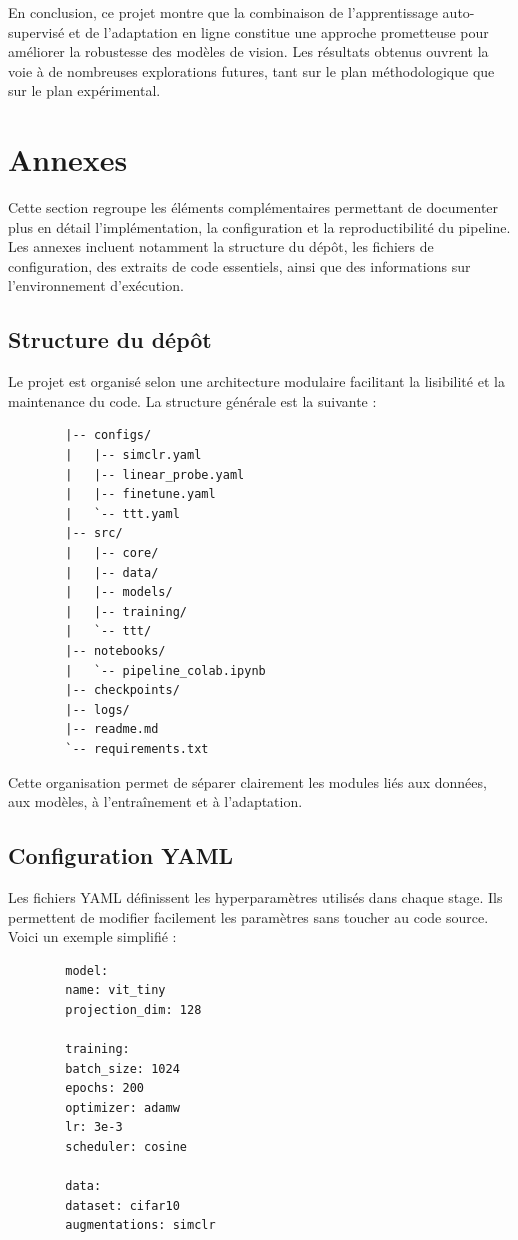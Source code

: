 \documentclass[12pt,a4paper]{report}
\begin{document}
	En conclusion, ce projet montre que la combinaison de l’apprentissage auto-supervisé et de l’adaptation en ligne constitue une approche prometteuse pour améliorer la robustesse des modèles de vision. Les résultats obtenus ouvrent la voie à de nombreuses explorations futures, tant sur le plan méthodologique que sur le plan expérimental.
	
	
	
	
	
	\appendix
	\chapter{Annexes}
	
	Cette section regroupe les éléments complémentaires permettant de documenter plus en détail l’implémentation, la configuration et la reproductibilité du pipeline. Les annexes incluent notamment la structure du dépôt, les fichiers de configuration, des extraits de code essentiels, ainsi que des informations sur l’environnement d’exécution.
	
	\section{Structure du dépôt}
	
	Le projet est organisé selon une architecture modulaire facilitant la lisibilité et la maintenance du code. La structure générale est la suivante :
	\begin{verbatim}
		|-- configs/
		|   |-- simclr.yaml
		|   |-- linear_probe.yaml
		|   |-- finetune.yaml
		|   `-- ttt.yaml
		|-- src/
		|   |-- core/
		|   |-- data/
		|   |-- models/
		|   |-- training/
		|   `-- ttt/
		|-- notebooks/
		|   `-- pipeline_colab.ipynb
		|-- checkpoints/
		|-- logs/
		|-- readme.md
		`-- requirements.txt
	\end{verbatim}
	Cette organisation permet de séparer clairement les modules liés aux données, aux modèles, à l’entraînement et à l’adaptation.
	
	\section{Configuration YAML}
	
	Les fichiers YAML définissent les hyperparamètres utilisés dans chaque stage. Ils permettent de modifier facilement les paramètres sans toucher au code source. Voici un exemple simplifié :
	
	\begin{verbatim}
		model:
		name: vit_tiny
		projection_dim: 128
		
		training:
		batch_size: 1024
		epochs: 200
		optimizer: adamw
		lr: 3e-3
		scheduler: cosine
		
		data:
		dataset: cifar10
		augmentations: simclr
	\end{verbatim}
	
\end{document}
